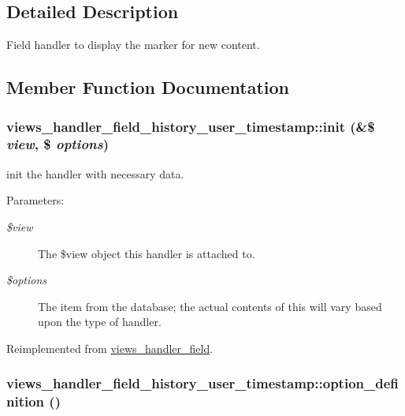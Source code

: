 \subsection{Detailed Description}
Field handler to display the marker for new content. 

\subsection{Member Function Documentation}
\hypertarget{classviews__handler__field__history__user__timestamp_0cc37c49613f0f55e4fc35733c35b806}{
\subsubsection[{init}]{\setlength{\rightskip}{0pt plus 5cm}views\_\-handler\_\-field\_\-history\_\-user\_\-timestamp::init (\&\$ {\em view}, \/  \$ {\em options})}}
\label{classviews__handler__field__history__user__timestamp_0cc37c49613f0f55e4fc35733c35b806}


init the handler with necessary data. \begin{Desc}
\item[Parameters:]
\begin{description}
\item[{\em \$view}]The \$view object this handler is attached to. \item[{\em \$options}]The item from the database; the actual contents of this will vary based upon the type of handler. \end{description}
\end{Desc}


Reimplemented from \hyperlink{classviews__handler__field_7eaaf0fd6fbc57c2955f88b257394d19}{views\_\-handler\_\-field}.\hypertarget{classviews__handler__field__history__user__timestamp_2cedbce8f02c9c051606c89e6d349e6b}{
\subsubsection[{option\_\-definition}]{\setlength{\rightskip}{0pt plus 5cm}views\_\-handler\_\-field\_\-history\_\-user\_\-timestamp::option\_\-definition ()}}
\label{classviews__handler__field__history__user__timestamp_2cedbce8f02c9c051606c89e6d349e6b}


